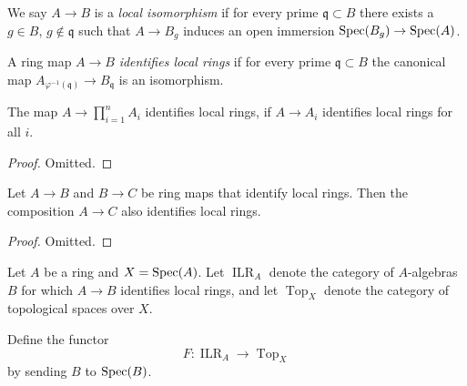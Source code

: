 \begin{definition}
  \label{def:local-isomorphism}
  We say $A \to B$ is a \emph{local isomorphism} if for every prime $\mathfrak{q} \subset B$ there exists a $g \in B$, $g \notin \mathfrak{q}$ such that $A \to B_g$ induces an open immersion $\operatorname{Spec} (B_g) \to \operatorname{Spec} (A)$.
\end{definition}

\begin{definition}
  A ring map $A \to B$ \emph{identifies local rings} if for every prime $\mathfrak{q} \subset B$ the canonical map $A_{\varphi^{-1}(\mathfrak{q})} \to B_{\mathfrak{q}}$ is an isomorphism.
  \label{def:identify-local-rings}
\end{definition}

\begin{lemma}
  \label{thm:finite-product-identifies-local-rings}
  The map \(A \to \prod_{i = 1}^{n} A_i \) identifies local rings, if \(A \to A_i\) identifies local rings for all \(i\).
\end{lemma}

\begin{proof}
  Omitted.
\end{proof}

\begin{lemma}
  \label{thm:identifies-local-rings-composition}
  Let \(A \to B\) and \(B \to C\) be ring maps that identify local rings. Then the composition \(A \to C\) also identifies local rings.
\end{lemma}

\begin{proof}
  Omitted.
\end{proof}

\begin{definition}{\cite[\href{https://stacks.math.columbia.edu/tag/096L}{Tag 096L}]{stacks-project}}
  \label{def:identifies-local-ring-to-top}
  Let $A$ be a ring and $X = \operatorname{Spec}(A)$. Let $\operatorname{ILR}_A$ denote the category of $A$-algebras $B$ for which $A \to B$ identifies local rings, and let $\operatorname{Top}_X$ denote the category of topological spaces over $X$.
  
  Define the functor
  \[
  F \colon \operatorname{ILR}_A \longrightarrow \operatorname{Top}_X
  \]
  by sending $B$ to $\operatorname{Spec}(B)$.
\end{definition}

